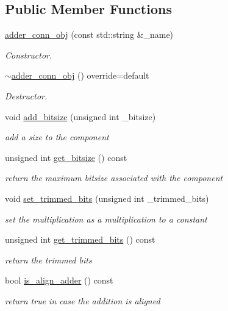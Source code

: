 \subsection*{Public Member Functions}
\begin{DoxyCompactItemize}
\item 
\hyperlink{classadder__conn__obj_afcde492f8237c3aec85536b4e85276b4}{adder\+\_\+conn\+\_\+obj} (const std\+::string \&\+\_\+name)
\begin{DoxyCompactList}\small\item\em Constructor. \end{DoxyCompactList}\item 
\hyperlink{classadder__conn__obj_a3d39a846cd2b74f7895927bf9c63e116}{$\sim$adder\+\_\+conn\+\_\+obj} () override=default
\begin{DoxyCompactList}\small\item\em Destructor. \end{DoxyCompactList}\item 
void \hyperlink{classadder__conn__obj_a9a52d1dc9b61c75ca6f8708beddc56b4}{add\+\_\+bitsize} (unsigned int \+\_\+bitsize)
\begin{DoxyCompactList}\small\item\em add a size to the component \end{DoxyCompactList}\item 
unsigned int \hyperlink{classadder__conn__obj_a05568e1511e7a9505d899ce6fa964f95}{get\+\_\+bitsize} () const
\begin{DoxyCompactList}\small\item\em return the maximum bitsize associated with the component \end{DoxyCompactList}\item 
void \hyperlink{classadder__conn__obj_a669d524d921f779ad0ada744dddc94b1}{set\+\_\+trimmed\+\_\+bits} (unsigned int \+\_\+trimmed\+\_\+bits)
\begin{DoxyCompactList}\small\item\em set the multiplication as a multiplication to a constant \end{DoxyCompactList}\item 
unsigned int \hyperlink{classadder__conn__obj_a3f08ac2713ff4c20f2eca3b6f3f3020b}{get\+\_\+trimmed\+\_\+bits} () const
\begin{DoxyCompactList}\small\item\em return the trimmed bits \end{DoxyCompactList}\item 
bool \hyperlink{classadder__conn__obj_ac3b31e89dd8e3114faac2cb3a609295c}{is\+\_\+align\+\_\+adder} () const
\begin{DoxyCompactList}\small\item\em return true in case the addition is aligned \end{DoxyCompactList}\end{DoxyCompactItemize}
